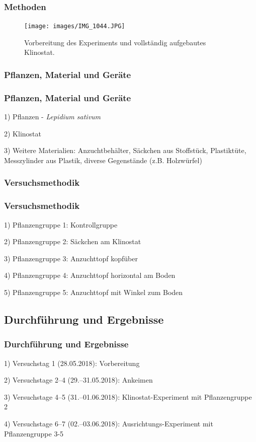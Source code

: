 \documentclass[aspectratio=169]{beamer}
\begin{document}
	\begin{frame}
		\frametitle{Methoden}
		\begin{figure}[H]
			\centering 
			\texttt{[image: images/IMG\_1044.JPG]}
			\caption{Vorbereitung des Experiments und vollständig aufgebautes Klinostat.\label{Klinostat2}}
		\end{figure}
		
	\end{frame}
	
	\subsubsection{Pflanzen, Material und Geräte}

	\begin{frame}
		\frametitle{Pflanzen, Material und Geräte}
		1) Pflanzen - \protect\emph{Lepidium sativum}
		
		2) Klinostat
		
		3) Weitere Materialien: Anzuchtbehälter, Säckchen aus Stoffstück, Plastiktüte, Messzylinder aus Plastik, diverse Gegenstände (z.B. Holzwürfel) 
	\end{frame}
	
	\subsubsection{Versuchsmethodik}
	
	\begin{frame}
		\frametitle{Versuchsmethodik}
		1) Pflanzengruppe 1: Kontrollgruppe
		
		2) Pflanzengruppe 2: Säckchen am Klinostat
		
		3) Pflanzengruppe 3: Anzuchttopf kopfüber
		
		4) Pflanzengruppe 4: Anzuchttopf horizontal am Boden
		
		5) Pflanzengruppe 5: Anzuchttopf mit Winkel zum Boden 
		
	\end{frame}
	
	\subsection{Durchführung und Ergebnisse}
	
	\begin{frame}
		\frametitle{Durchführung und Ergebnisse}
		
		1) Versuchstag 1 (28.05.2018): Vorbereitung
		
		2) Versuchstage 2–4 (29.–31.05.2018): Ankeimen
		
		3) Versuchstage 4–5 (31.–01.06.2018): Klinostat-Experiment mit Pflanzengruppe 2
		
		4) Versuchstage 6–7 (02.–03.06.2018): Ausrichtungs-Experiment mit Pflanzengruppe 3-5
	\end{frame}
	
\end{document}
